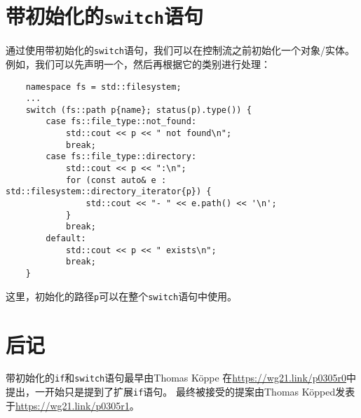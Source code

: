 \section{带初始化的\texttt{switch}语句}\label{ch2.2}
通过使用带初始化的\texttt{switch}语句，我们可以在控制流之前初始化一个对象/实体。
例如，我们可以先声明一个，然后再根据它的类别进行处理：
\begin{lstlisting}
    namespace fs = std::filesystem;
    ...
    switch (fs::path p{name}; status(p).type()) {
        case fs::file_type::not_found:
            std::cout << p << " not found\n";
            break;
        case fs::file_type::directory:
            std::cout << p << ":\n";
            for (const auto& e : std::filesystem::directory_iterator{p}) {
                std::cout << "- " << e.path() << '\n';
            }
            break;
        default:
            std::cout << p << " exists\n";
            break;
    }
\end{lstlisting}
这里，初始化的路径\texttt{p}可以在整个\texttt{switch}语句中使用。

\section{后记}
带初始化的\texttt{if}和\texttt{switch}语句最早由Thomas Köppe
在\url{https://wg21.link/p0305r0}中提出，一开始只是提到了扩展\texttt{if}语句。
最终被接受的提案由Thomas Köpped发表于\url{https://wg21.link/p0305r1}。